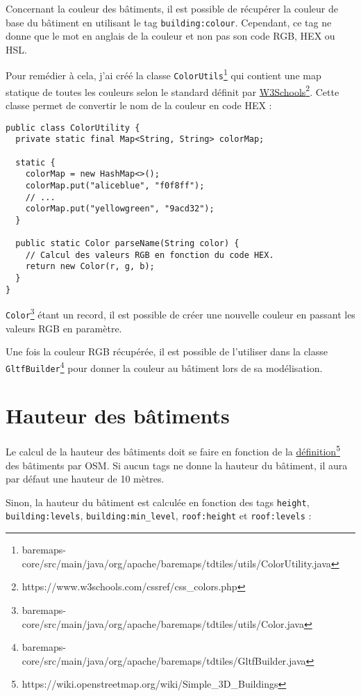 Concernant la couleur des bâtiments, il est possible de récupérer la couleur de base du bâtiment en utilisant le tag \texttt{building:colour}. Cependant, ce tag ne donne que le mot en anglais de la couleur et non pas son code RGB, HEX ou HSL.

Pour remédier à cela, j'ai créé la classe \texttt{ColorUtils}\footnote{baremaps-core/src/main/java/org/apache/baremaps/tdtiles/utils/ColorUtility.java} qui contient une map statique de toutes les couleurs selon le standard définit par \href{https://www.w3schools.com/cssref/css_colors.php}{W3Schools}\footnote{https://www.w3schools.com/cssref/css\_colors.php}. Cette classe permet de convertir le nom de la couleur en code HEX :

\begin{lstlisting}[style=java]
public class ColorUtility {
  private static final Map<String, String> colorMap;

  static {
    colorMap = new HashMap<>();
    colorMap.put("aliceblue", "f0f8ff");
    // ...
    colorMap.put("yellowgreen", "9acd32");
  }

  public static Color parseName(String color) {
    // Calcul des valeurs RGB en fonction du code HEX.
    return new Color(r, g, b);
  }
}
\end{lstlisting}

\texttt{Color}\footnote{baremaps-core/src/main/java/org/apache/baremaps/tdtiles/utils/Color.java} étant un record, il est possible de créer une nouvelle couleur en passant les valeurs RGB en paramètre.

Une fois la couleur RGB récupérée, il est possible de l'utiliser dans la classe \texttt{GltfBuilder}\footnote{baremaps-core/src/main/java/org/apache/baremaps/tdtiles/GltfBuilder.java} pour donner la couleur au bâtiment lors de sa modélisation.

\newpage

\section{Hauteur des bâtiments}

Le calcul de la hauteur des bâtiments doit se faire en fonction de la \href{https://wiki.openstreetmap.org/wiki/Simple_3D_Buildings}{définition}\footnote{https://wiki.openstreetmap.org/wiki/Simple\_3D\_Buildings} des bâtiments par OSM. Si aucun tags ne donne la hauteur du bâtiment, il aura par défaut une hauteur de 10 mètres.

Sinon, la hauteur du bâtiment est calculée en fonction des tags \texttt{height}, \texttt{building:levels}, \texttt{building:min\_level}, \texttt{roof:height} et \texttt{roof:levels} :

